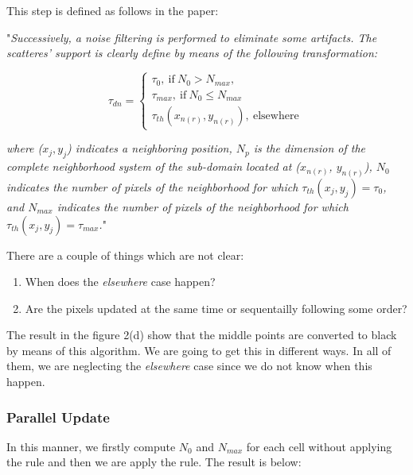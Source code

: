 \documentclass[11pt]{article}
\providecommand{\tightlist}{%
      \setlength{\itemsep}{0pt}\setlength{\parskip}{0pt}}
\begin{document}
This step is defined as follows in the paper:

"\emph{Successively, a noise filtering is performed to eliminate some
artifacts. The scatteres' support is clearly define by means of the
following transformation:}

\[ \tau_{dn} = \begin{cases} \tau_0, ~\mathrm{if}~ N_0 > N_{max}, \\ \tau_{max}, ~\mathrm{if}~ N_0 \leq N_{max} \\ \tau_{th}(x_{n(r)}, y_{n(r)}), ~\mathrm{elsewhere}~ \end{cases} \]

\emph{where (\(x_j, y_j\)) indicates a neighboring position, \(N_p\) is
the dimension of the complete neighborhood system of the sub-domain
located at (\(x_{n(r)}\), \(y_{n(r)}\)), \(N_0\) indicates the number of
pixels of the neighborhood for which \(\tau_{th}(x_j, y_j) = \tau_0\),
and \(N_{max}\) indicates the number of pixels of the neighborhood for
which \(\tau_{th}(x_j, y_j) = \tau_{max}\).}"

There are a couple of things which are not clear:

\begin{enumerate}
\def\labelenumi{\arabic{enumi}.}
\tightlist
\item
  When does the \emph{elsewhere} case happen?
\item
  Are the pixels updated at the same time or sequentailly following some
  order?
\end{enumerate}

The result in the figure 2(d) show that the middle points are converted
to black by means of this algorithm. We are going to get this in
different ways. In all of them, we are neglecting the \emph{elsewhere}
case since we do not know when this happen.

\hypertarget{parallel-update}{%
\subsubsection{Parallel Update}\label{parallel-update}}

In this manner, we firstly compute \(N_0\) and \(N_{max}\) for each cell
without applying the rule and then we are apply the rule. The result is
below:
\end{document}
